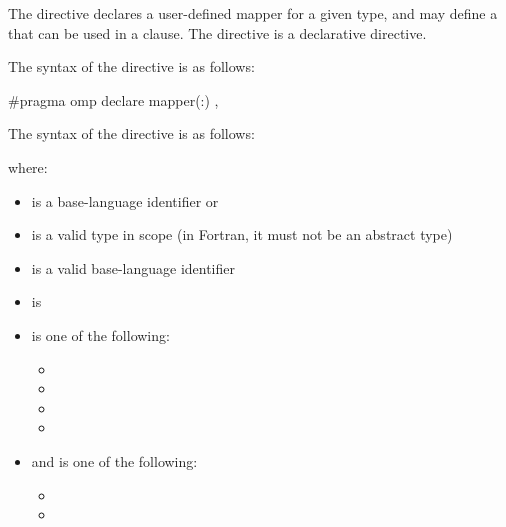 \summary

The  directive declares a user-defined mapper for a given
type, and may define a  that can be used in a 
clause. The  directive is a declarative directive.

\syntax
\begin{ccppspecific}
The syntax of the  directive is as follows:

\begin{ompcPragma}
#pragma omp declare mapper(\plc{[mapper-identifier}:\plc{]type var})
\plc{[clause[ [},\plc{] clause] ... ] new-line}
\end{ompcPragma}

\end{ccppspecific}

\begin{fortranspecific}
The syntax of the  directive is as follows:


\end{fortranspecific}

where:

\begin{itemize}
  \item {} is a base-language identifier or 
  \item {} is a valid type in scope (in Fortran, it must not be an abstract type)
  \item {} is a valid base-language identifier
  \item {} is \plc{[[map-type-modifier[}\pcode{,}\plc{] [map-type-modifier[}\pcode{,}\plc{] ...]] map-type}\pcode{:}\plc{ ] list}\pcode{)}
  \item {} is one of the following:
    \begin{itemize}
      \item {}
      \item {}
      \item {}
      \item {}
    \end{itemize}
  \item and  is one of the following:
    \begin{itemize}
      \item {}
      \item {}
    \end{itemize}
\end{itemize}

